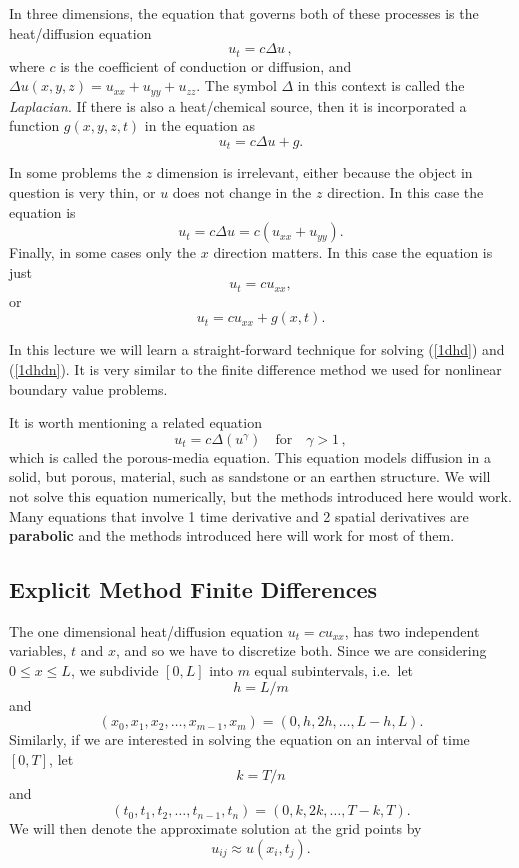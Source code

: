 In three dimensions, the equation that governs both of these processes
is the heat/diffusion equation
$$
   u_t = c \Delta u
\,,
$$
where $c$ is the coefficient of conduction or diffusion, and $
     \Delta u(x,y,z) = u_{xx} + u_{yy} + u_{zz}$.
The symbol $\Delta$ in this context is called the {\em Laplacian}.
If there is also a heat/chemical source, then it is incorporated
a function $g(x,y,z,t)$ in the equation as
$$
    u_t = c \Delta u + g.
$$

In some problems the $z$ dimension is irrelevant, either because the
object in question is very thin, or $u$ does not change in the $z$
direction. In this case the equation is
$$
   u_t = c \Delta u = c ( u_{xx} + u_{yy}).
$$
Finally, in some cases only the $x$ direction matters. In this case
the equation is just
\begin{equation}\label{1dhd}
    u_t = c u_{xx},
\end{equation}
or
\begin{equation}\label{1dhdn}
    u_t = c u_{xx} + g(x,t).
\end{equation}

In this lecture we will learn a straight-forward technique
for solving (\ref{1dhd}) and (\ref{1dhdn}). It is very
similar to the finite difference method we used for nonlinear
boundary value problems.

It is worth mentioning a related equation
$$
    u_t = c \Delta (u^\gamma)\quad\text{for}\quad\gamma >1
\,,
$$
which is called the porous-media equation.
This equation models diffusion in a solid, but porous, material,
such as sandstone or an earthen structure. We will
not solve this equation numerically, but the methods introduced
here would work. Many equations that involve 1 time derivative
and 2 spatial derivatives are {\bf parabolic} and
the methods introduced here will work for most of
them.


\subsection*{Explicit Method Finite Differences}

The one dimensional heat/diffusion equation $u_t = c u_{xx}$, has two
independent variables, $t$ and $x$, and so we have to discretize both.
Since we are considering $0 \le x \le L$, we subdivide $[0,L]$ into
$m$ equal subintervals, i.e.~let $$ h = L/m $$ and $$ (x_0, x_1, x_2,
\ldots, x_{m-1}, x_m) = (0, h, 2h, \ldots, L-h, L).  $$ Similarly, if
we are interested in solving the equation on an interval of time
$[0,T]$, let $$ k = T/n $$ and $$ (t_0, t_1, t_2, \ldots, t_{n-1},
t_n) = (0, k, 2k, \ldots, T - k, T).  $$ We will then denote the
approximate solution at the grid points by $$ u_{ij} \approx
u(x_i,t_j).  $$

